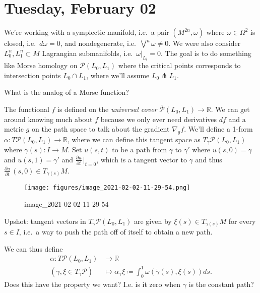 \hypertarget{tuesday-february-02}{%
\section{Tuesday, February 02}\label{tuesday-february-02}}

\begin{remark}[Setup]

We're working with a symplectic manifold, i.e.~a pair
\((M^{2n}, \omega)\) where \(\omega \in \Omega^2\) is closed,
i.e.~\(d \omega = 0\), and nondegenerate,
i.e.~\(\bigvee^n \omega \neq 0\). We were also consider
\(L^n_0, L^n_1 \subset M\) Lagrangian submanifolds,
i.e.~\({ \left.{{ \omega }} \right|_{{L_i}} } = 0\). The goal is to do
something like Morse homology on \(\mathcal{P}(L_0, L_1)\) where the
critical points corresponds to intersection points \(L_0 \cap L_1\),
where we'll assume \(L_0 \pitchfork L_1\).

\end{remark}

\begin{question}

What is the analog of a Morse function?

\end{question}

\begin{remark}

The functional \(f\) is defined on the \emph{universal cover}
\(\overline{\mathcal{P}}(L_0, L_1) \to {\mathbb{R}}\). We can get around
knowing much about \(f\) because we only ever need derivatives \(df\)
and a metric \(g\) on the path space to talk about the gradient
\(\nabla_g f\). We'll define a 1-form
\(\alpha: T \mathcal{P}(L_0, L_1) \to {\mathbb{R}}\), where we can
define this tangent space as \(T_{\gamma} \mathcal{P}(L_0, L_1)\) where
\(\gamma(s): I \to M\). Set \(u(s, t)\) to be a path from \(\gamma\) to
\(\gamma'\) where \(u(s, 0) = \gamma\) and \(u(s, 1) = \gamma'\) and
\({\frac{\partial u}{\partial t}\,}\Big|_{t=0}\), which is a tangent
vector to \(\gamma\) and thus
\({\frac{\partial u}{\partial t}\,}(s, 0) \in T_{\gamma(s)}M\).

\begin{figure}
\centering
\texttt{[image: figures/image\_2021-02-02-11-29-54.png]}
\caption{image\_2021-02-02-11-29-54}
\end{figure}

Upshot: tangent vectors in \(T_{\gamma} \mathcal{P}(L_0, L_1)\) are
given by \(\xi(s) \in T_{\gamma(s)}M\) for every \(s \in I\), i.e.~a way
to push the path off of itself to obtain a new path.

We can thus define
\begin{align*}
\alpha: T\mathcal{P}(L_0, L_1) &\to {\mathbb{R}}\\
( \gamma, \xi \in T_{\gamma} \mathcal{P}) &\mapsto \alpha_{\gamma}{\xi} \coloneqq\int_0^1 \omega( \dot{\gamma}(s), \xi(s)) ds
.\end{align*}
Does this have the property we want? I.e. is it zero when \(\gamma\) is
the constant path?

\end{remark}

